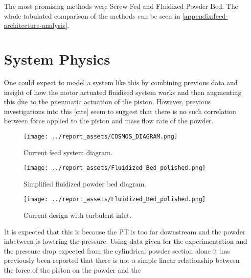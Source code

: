 The most promising methods were Screw Fed and Fluidized Powder Bed. The whole tabulated comparison of the methods can be seen in \autoref{appendix:feed-architecture-analysis}.



\newpage
\section{System Physics}
One could expect to model a system like this by combining previous data and insight of how the motor actuated fluidised system works and then augmenting this due to the pneumatic actuation of the piston. However, previous investigations into this [cite] seem to suggest that there is no such correlation between force applied to the piston and mass flow rate of the powder. 

\begin{figure}[htbp]
    \centering

    \begin{minipage}{0.3\textwidth}
        \centering
        \texttt{[image: ../report\_assets/COSMOS\_DIAGRAM.png]}
        \caption{Current feed system diagram.}\label{fig:idkyet1}
    \end{minipage}
    \hfill
    \begin{minipage}{0.3\textwidth}
        \centering
        \texttt{[image: ../report\_assets/Fluidized\_Bed\_polished.png]}
        \caption{Simplified fluidized powder bed diagram.}\label{fig:idkyet2}
    \end{minipage}
    \hfill
    \begin{minipage}{0.3\textwidth}
        \centering
        \texttt{[image: ../report\_assets/Fluidized\_Bed\_polished.png]}
        \caption{Current design with turbulent inlet.}\label{fig:idkyet3}
    \end{minipage}

\end{figure}
It is expected that this is because the PT is too far downstream and the powder inbetween is lowering the pressure. Using data given for the experimentation and the pressure drop expected from the cylindrical powder section alone
it has previously been reported that there is not a simple linear relationship between the force of the piston on the powder and the 


